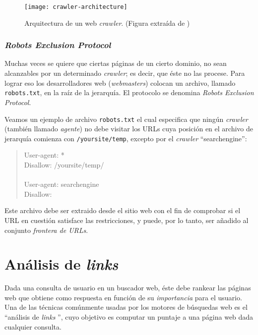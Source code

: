 			\begin{figure}[h]
				\texttt{[image: crawler-architecture]}
				\centering
				\caption{Arquitectura de un web \textit{crawler}. (Figura extraída de \cite{manning2009})}
				\label{fig:crawler-architecture}
			\end{figure}
			
		\subsubsection{\textit{Robots Exclusion Protocol}}
			Muchas veces se quiere que ciertas páginas de un cierto dominio, no sean alcanzables por un determinado \textit{crawler}; es decir, que éste no las procese. Para lograr eso los desarrolladores web (\textit{webmasters}) colocan un archivo, llamado \texttt{robots.txt}, en la raíz de la jerarquía. El protocolo se denomina \textit{Robots Exclusion Protocol}. \par
			
			Veamos un ejemplo de archivo \texttt{robots.txt} el cual especifica que ningún \textit{crawler} (también llamado \textit{agente}) no debe visitar los URLs cuya posición en el archivo de jerarquía comienza con \texttt{/yoursite/temp}, excepto por el \textit{crawler} \enquote{searchengine}:
			\begin{quote}
				\begin{ttfamily}
					User-agent: * \\
					Disallow: /yoursite/temp/ \\ \\
					
					User-agent: searchengine \\
					Disallow:
				\end{ttfamily}
			\end{quote}
			
			Este archivo debe ser extraido desde el sitio web con el fin de comprobar si el URL en cuestión satisface las restricciones, y puede, por lo tanto, ser añadido al conjunto \textit{frontera de URLs}.
			

\section{Análisis de \textit{links}}
	Dada una consulta de usuario en un buscador web, éste debe rankear las páginas web que obtiene como respuesta en función de su \textit{importancia} para el usuario. Una de las técnicas comúnmente usadas por los motores de búsquedas web es el \enquote{análisis de \textit{links} }, cuyo objetivo es computar un puntaje a una página web dada cualquier consulta. \par
	
